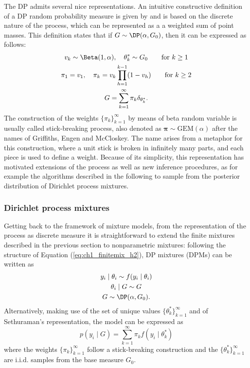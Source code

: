 The DP admits several nice representations. An intuitive constructive definition of a DP random probability measure is given by \citet{sethuraman1994} and is based on the discrete nature of the process, which can be represented as a a weighted sum of point masses. This definition states that if  $G\sim \DP(\alpha, G_0)$, then it can be expressed as follows:
\begin{gather} 
v_k \sim \Beta(1,\alpha), \quad \theta^*_k \sim G_0 \qquad \text{for } k\geq 1  \nonumber\\
\pi_1 = v_1, \quad \pi_k = v_k \prod_{h = 1}^{k-1} (1-v_h) \qquad \text{for } k\geq 2 \label{eq:ch1_stickbreaking}\\
G = \sum_{k=1}^{\infty} \pi_k \delta_{\theta^*_k}. \nonumber
\end{gather}
The construction of the weights $\{\pi_k\}_{k=1}^{\infty}$ by means of beta random variable is usually called stick-breaking process, also denoted as $\bm{\pi}\sim \mathrm{GEM}(\alpha)$ after the names of Griffiths, Engen and McCloskey. The name arises from a metaphor for this construction, where a unit stick is broken in infinitely many parts, and each piece is used to define a weight.
Because of its simplicity, this representation has motivated extensions of the process as well as new inference procedures, as for example the algorithms described in the following to sample from the posterior distribution of Dirichlet process mixtures.


\subsubsection*{Dirichlet process mixtures}
Getting back to the framework of mixture models, from the representation of the process as discrete measure it is straightforward to extend the finite mixtures described in the previous section to nonparametric mixtures: following the structure of Equation (\ref{eq:ch1_finitemix_h2}), DP mixtures (DPMs) can be written as
\begin{equation*}
\begin{gathered}
y_i \mid \theta_i \sim f(y_i\mid\theta_i)\\
\theta_i \mid G \sim G \\
G \sim \DP(\alpha,G_0).
\end{gathered}
\end{equation*}
Alternatively, making use of the set of unique values $\{\theta^*_k\}_{k=1}^{\infty}$ and of Sethuraman's representation, the model can be expressed as
\begin{equation}
p(y_i\mid G) = \sum_{k=1}^{\infty} \pi_k f(y_i\mid\theta^*_k)
\label{eq:ch1_DPM}
\end{equation}
where the weights $\{\pi_k\}_{k=1}^{\infty}$ follow a stick-breaking construction and the $\{\theta^*_k\}_{k=1}^{\infty}$ are i.i.d. samples from the base measure $G_0$.

